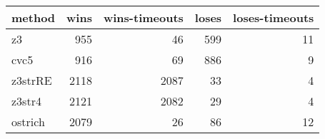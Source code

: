 \begin{tabular}{lrrrr}
\hline
 method   &   wins &   wins-timeouts &   loses &   loses-timeouts \\
\hline
 z3       &    955 &              46 &     599 &               11 \\
 cvc5     &    916 &              69 &     886 &                9 \\
 z3strRE  &   2118 &            2087 &      33 &                4 \\
 z3str4   &   2121 &            2082 &      29 &                4 \\
 ostrich  &   2079 &              26 &      86 &               12 \\
\hline
\end{tabular}
